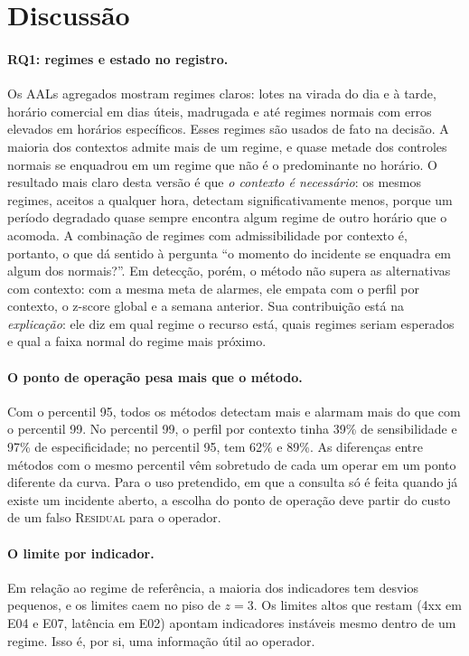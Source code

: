 \documentclass[sigconf,nonacm]{acmart}
\newcommand{\Residual}{\textsc{Residual}\xspace}
\begin{document}
\section{Discussão}\label{sec:discussao}

\paragraph{RQ1: regimes e estado no registro.} Os AALs agregados mostram regimes claros: lotes na virada do dia e à tarde, horário comercial em dias úteis, madrugada e até regimes normais com erros elevados em horários específicos. Esses regimes são usados de fato na decisão. A maioria dos contextos admite mais de um regime, e quase metade dos controles normais se enquadrou em um regime que não é o predominante no horário. O resultado mais claro desta versão é que \emph{o contexto é necessário}: os mesmos regimes, aceitos a qualquer hora, detectam significativamente menos, porque um período degradado quase sempre encontra algum regime de outro horário que o acomoda. A combinação de regimes com admissibilidade por contexto é, portanto, o que dá sentido à pergunta ``o momento do incidente se enquadra em algum dos normais?''. Em detecção, porém, o método não supera as alternativas com contexto: com a mesma meta de alarmes, ele empata com o perfil por contexto, o z-score global e a semana anterior. Sua contribuição está na \emph{explicação}: ele diz em qual regime o recurso está, quais regimes seriam esperados e qual a faixa normal do regime mais próximo.

\paragraph{O ponto de operação pesa mais que o método.} Com o percentil 95, todos os métodos detectam mais e alarmam mais do que com o percentil 99. No percentil 99, o perfil por contexto tinha 39\% de sensibilidade e 97\% de especificidade; no percentil 95, tem 62\% e 89\%. As diferenças entre métodos com o mesmo percentil vêm sobretudo de cada um operar em um ponto diferente da curva. Para o uso pretendido, em que a consulta só é feita quando já existe um incidente aberto, a escolha do ponto de operação deve partir do custo de um falso \Residual para o operador.

\paragraph{O limite por indicador.} Em relação ao regime de referência, a maioria dos indicadores tem desvios pequenos, e os limites caem no piso de $z=3$. Os limites altos que restam (4xx em E04 e E07, latência em E02) apontam indicadores instáveis mesmo dentro de um regime. Isso é, por si, uma informação útil ao operador.
\end{document}
